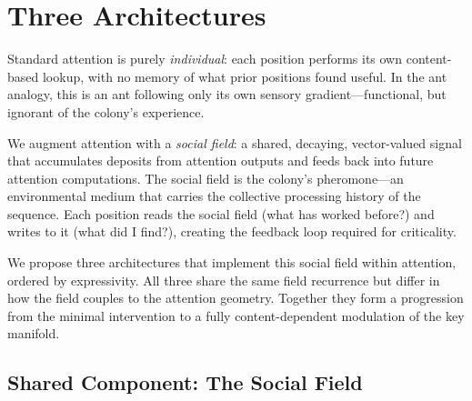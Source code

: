 \documentclass[11pt,a4paper]{article}
\begin{document}
\section{Three Architectures}
\label{sec:architecture}

Standard attention is purely \emph{individual}: each position
performs its own content-based lookup, with no memory of what prior
positions found useful.  In the ant analogy, this is an ant following
only its own sensory gradient---functional, but ignorant of the
colony's experience.

We augment attention with a \emph{social field}: a shared,
decaying, vector-valued signal that accumulates deposits from
attention outputs and feeds back into future attention computations.
The social field is the colony's pheromone---an environmental medium
that carries the collective processing history of the sequence.  Each
position reads the social field (what has worked before?) and writes
to it (what did I find?), creating the feedback loop required for
criticality.

We propose three architectures that implement this social field
within attention, ordered by expressivity.  All three share the same
field recurrence but differ in how the field couples to the attention
geometry.  Together they form a progression from the minimal
intervention to a fully content-dependent modulation of the key
manifold.

\subsection{Shared Component: The Social Field}
\end{document}
